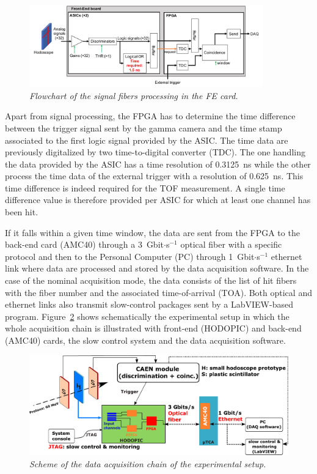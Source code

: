 \documentclass[a4paper,11pt]{article}
\begin{document}
\begin{figure}[htb]
\centering
\includegraphics[width=0.9\textwidth]{figures/Hodoscope_reading_scheme.pdf}
\caption{\small{\textit{Flowchart of the signal fibers processing in the FE card.}}}
\label{fig:Scheme_reading_hodo}
\end{figure} 

Apart from signal processing, the FPGA has to determine the time difference between the trigger signal sent by the gamma camera and the time stamp associated to the first logic signal provided by the ASIC. The time data are previously digitalized by two time-to-digital converter (TDC). The one handling the data provided by the ASIC has a time resolution of 0.3125~ns while the other process the time data of the external trigger with a resolution of 0.625~ns. This time difference is indeed required for the TOF measurement. A single time difference value is therefore provided per ASIC for which at least one channel has been hit.

If it falls within a given time window, the data are sent from the FPGA to the back-end card (AMC40) \cite{Cachemiche2010} through a 3~Gbit$\cdot$s$^{-1}$ optical fiber with a specific protocol \cite{deng2013, Chen2017, Chen2019, Caplan2019} and then to the Personal Computer (PC) through 1~Gbit$\cdot$s$^{-1}$ ethernet link where data are processed and stored by the data acquisition software. In the case of the nominal acquisition mode, the data consists of the list of hit fibers with the fiber number and the associated time-of-arrival (TOA). Both optical and ethernet links also transmit slow-control packages sent by a LabVIEW-based program. Figure~\ref{fig:Scheme_Setup_hodo} shows schematically the experimental setup in which the whole acquisition chain is illustrated with front-end (HODOPIC) and back-end (AMC40) cards, the slow control system  and the data acquisition software.

\begin{figure}[htb]
\centering
\includegraphics[width=1\textwidth]{figures/Scheme_Setup_Nice_08_2019.pdf}
\caption{\small{\textit{Scheme of the data acquisition chain of the experimental setup.}}}
\label{fig:Scheme_Setup_hodo}
\end{figure} 
\end{document}
